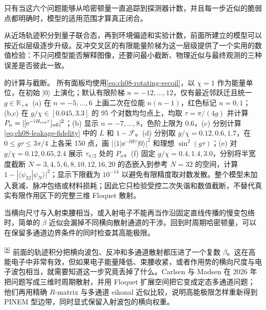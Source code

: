 只有当这六个问题能够从哈密顿量一直追踪到探测器计数，并且每一步近似的脆弱点都明确时，模型的适用范围才算真正闭合。

\par\medskip 从近场轨迹积分到量子联合态，再到环境偏迹和实验计数，前面所建立的模型可以按近似层级逐步升级。反冲交叉区的有限能量阶梯为这一层级提供了一个实用的数值检验：不只问模型能否解释图像，还要问最小截断、物理近似与最终观测的三种误差是否彼此一致。

\par\medskip

\noindent {} 的计算与截断。
所有面板均使用\cref{eq:ch08-rotating-recoil}，以 $\chi=1$ 作为能量单位，在初始 $|0\rangle$ 上演化；默认有限阶梯 $n=-12,\ldots,12$，仅有最近邻跃迁且统一 $g\in\mathbb R_+$。(a) 在 $n=-5,\ldots,6$ 上画二次在位能 $n(n-1)$，红色标记 $n=0,1$；(b,c) 在 $g/\chi\in[0.045,3.3]$ 的 95 个对数均匀点上，均取 $\tau=\pi/(4g)$ 并计算 $P_n=|[\mathrm{e}^{-\mathrm{i} H_{\rm rot}\tau}]_{n0}|^2$；(b) 显示 $n=-7,\ldots,8$，色阶上限为 $0.6$，(c) 分别计算\cref{eq:ch08-leakage-fidelity} 中的 $L$ 和 $1-\mathcal F$。(d) 分别取 $g/\chi=0.12,0.6,1.7$，在 $0\le g\tau\le3\pi/4$ 上各采 150 点，画 $|\langle1|\ee^{-\ii H\tau}|0\rangle|^2$ 和理想 $\sin^2(g\tau)$；(e) 对 $g/\chi=0.12,0.65,2.4$ 展示 $\tau_{\pi/2}$ 处的 $P_n$。(f) 固定 $g/\chi=0.4,1.4,3.0$，分别将半宽度截断 $N=3,4,5,6,8,10,12,16,20$ 的态嵌入到参考 $N=32$ 的空间，计算 $1-|\langle\psi_{32}|\psi_N\rangle|^2$；显示下限截为 $10^{-14}$ 以避免有限精度取对数发散。整个模型未加入衰减、脉冲包络或材料损耗；因此它只检验受控二次失谐和数值截断，不替代真实有限作用区下的完整三维 Floquet 散射。


当横向尺寸与入射束腰相当，或入射电子不能再当作沿固定直线传播的慢变包络时，简单的 $\beta$ 近似会漏掉不同横向散射通道的干涉。回到时周期哈密顿量，可以在保留多通道边界条件的同时检查其高能极限。

\textsuperscript{\hyperref[ch01-ref8]{[8]}}
前面的轨迹积分把横向波包、反冲和多通道散射都压进了一个复数 $\beta$。这在高能电子中非常有效，但如果电子能量降低、束腰收紧，或者作用势的横向尺度与电子波包相当，就需要知道这一步究竟丢掉了什么。Carlsen 与 Madsen 在 2026 年把问题写成三维时周期散射，并用 Floquet 扩展空间把它变成定态多通道问题；他们再用精确 $R$-matrix 与多通道 eikonal 近似比较，说明高能极限怎样重新得到 PINEM 型边带，同时显式保留入射波包的横向权重。

